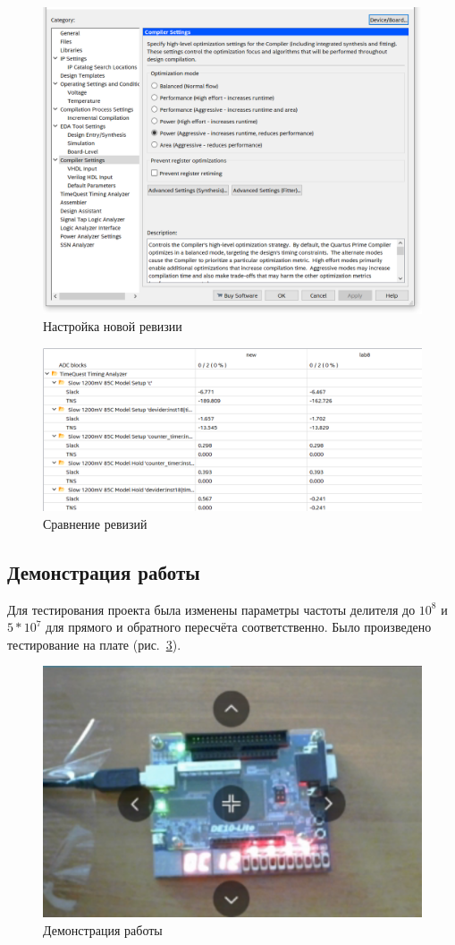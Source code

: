 \documentclass[a4paper,14pt]{article}
\begin{document}
\begin{figure}[H]
	\centering
	\includegraphics[width=0.8\linewidth]{image/settings}
	\caption{Настройка новой ревизии}
	\label{fig:settings}
\end{figure}

\begin{figure}[H]
	\centering
	\includegraphics[width=0.8\linewidth]{image/diff}
	\caption{Сравнение ревизий}
	\label{fig:diff}
\end{figure}

\subsection{Демонстрация работы}

Для тестирования проекта была изменены параметры частоты делителя до $10^8$ и $5 * 10^7$ для прямого и обратного пересчёта соответственно.
Было произведено тестирование на плате (рис.~\ref{fig:demo}).

\begin{figure}[H]
	\centering
	\includegraphics[width=0.8\linewidth]{image/demo}
	\caption{Демонстрация работы}
	\label{fig:demo}
\end{figure}
\end{document}
